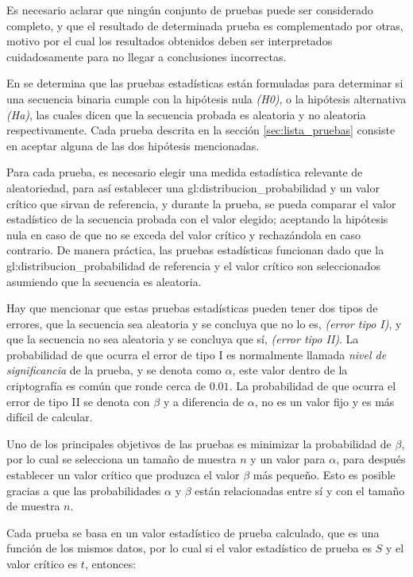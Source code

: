 Es necesario aclarar que ningún conjunto de pruebas puede ser considerado
completo, y que el resultado de determinada prueba es complementado por
otras, motivo por el cual los resultados obtenidos deben ser interpretados
cuidadosamente para no llegar a conclusiones incorrectas.

En \cite{nist_pruebas} se determina que las pruebas estadísticas están
formuladas para determinar si una secuencia binaria cumple con la hipótesis
nula \textit{(H0)}, o la hipótesis alternativa \textit{(Ha)}, las cuales dicen
que la secuencia probada es aleatoria y no aleatoria respectivamente. Cada
prueba descrita en la sección \ref{sec:lista_pruebas} consiste en aceptar
alguna de las dos hipótesis mencionadas.

Para cada prueba, es necesario elegir una medida estadística relevante de
aleatoriedad, para así establecer una \gls{gl:distribucion_probabilidad} y un
valor crítico que sirvan de referencia, y durante la prueba, se pueda
comparar el valor estadístico de la secuencia probada con el valor elegido;
aceptando la hipótesis nula en caso de que no se exceda del valor crítico y
rechazándola en caso contrario. De manera práctica, las pruebas estadísticas
funcionan dado que la \gls{gl:distribucion_probabilidad} de referencia y el
valor crítico son seleccionados asumiendo que la secuencia es aleatoria.

Hay que mencionar que estas pruebas estadísticas pueden tener dos tipos de
errores, que la secuencia sea aleatoria y se concluya que no lo es,
\textit{(error tipo I)}, y que la secuencia no sea aleatoria y se concluya
que sí, \textit{(error tipo II)}. La probabilidad de que ocurra el error de
tipo I es normalmente llamada \textit{nivel de significancia} de la prueba, y se
denota como $\alpha$, este valor dentro de la criptografía es común que ronde
cerca de $0.01$. La probabilidad de que ocurra el error de tipo II se denota
con $\beta$ y a diferencia de $\alpha$, no es un valor fijo y es más difícil
de calcular.

Uno de los principales objetivos de las pruebas es minimizar la probabilidad
de $\beta$, por lo cual se selecciona un tamaño de muestra $n$ y un valor para
$\alpha$, para después establecer un valor crítico que produzca el valor
$\beta$ más pequeño. Esto es posible gracias a que las probabilidades $\alpha$
y $\beta$ están relacionadas entre sí y con el tamaño de muestra $n$.

Cada prueba se basa en un valor estadístico de prueba calculado, que es una
función de los mismos datos, por lo cual si el valor estadístico de prueba
es $S$ y el valor crítico es $t$, entonces:

